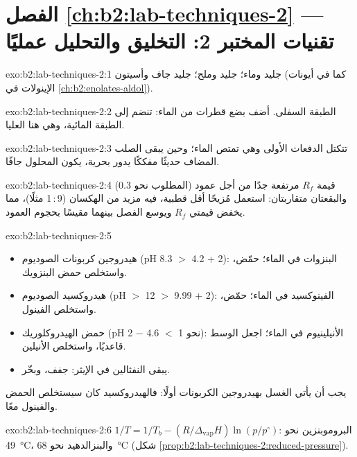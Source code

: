 \section*{الفصل \ref{ch:b2:lab-techniques-2} --- تقنيات المختبر 2: التخليق والتحليل عمليًا}

\begin{solution}{exo:b2:lab-techniques-2:1}
جليد وماء؛ جليد وملح؛ جليد جاف وأسيتون (كما في أيونات الإينولات في \cref{ch:b2:enolates-aldol}).
\end{solution}

\begin{solution}{exo:b2:lab-techniques-2:2}
الطبقة السفلى. أضف بضع قطرات من الماء: تنضم إلى الطبقة المائية، وهي هنا العليا.
\end{solution}

\begin{solution}{exo:b2:lab-techniques-2:3}
تتكتل الدفعات الأولى وهي تمتص الماء؛ وحين يبقى الصلب المضاف حديثًا مفككًا يدور بحرية،
يكون المحلول جافًا.
\end{solution}

\begin{solution}{exo:b2:lab-techniques-2:4}
قيمة $R_f$ مرتفعة جدًا من أجل عمود (المطلوب نحو 0.3) والبقعتان متقاربتان: استعمل مُزيحًا أقل
قطبية، فيه مزيد من الهكسان (9\,:\,1 مثلًا)، مما يخفض قيمتي $R_f$ ويوسع الفصل بينهما مقيسًا
بحجوم العمود.
\end{solution}

\begin{solution}{exo:b2:lab-techniques-2:5}
\begin{itemize}
  \item هيدروجين كربونات الصوديوم (pH 8.3 $>$ 4.2 + 2): البنزوات في الماء؛ حمّض، واستخلص حمض البنزويك.
  \item هيدروكسيد الصوديوم (pH $>$ 12 $>$ 9.99 + 2): الفينوكسيد في الماء؛ حمّض، واستخلص الفينول.
  \item حمض الهيدروكلوريك (pH نحو 1 $<$ 4.6 $-$ 2): الأنيلينيوم في الماء؛ اجعل الوسط قاعديًا، واستخلص الأنيلين.
  \item يبقى النفثالين في الإيثر: جفف، وبخّر.
\end{itemize}
يجب أن يأتي الغسل بهيدروجين الكربونات أولًا: فالهيدروكسيد كان سيستخلص الحمض والفينول معًا.
\end{solution}

\begin{solution}{exo:b2:lab-techniques-2:6}
$1/T = 1/T_b - (R/\Delta_{\mathrm{vap}}H)\ln(p/p^\circ)$: البروموبنزين نحو \qty{49}{\degreeCelsius}،
والبنزالدهيد نحو \qty{68}{\degreeCelsius} (شكل \cref{prop:b2:lab-techniques-2:reduced-pressure}).
\end{solution}

